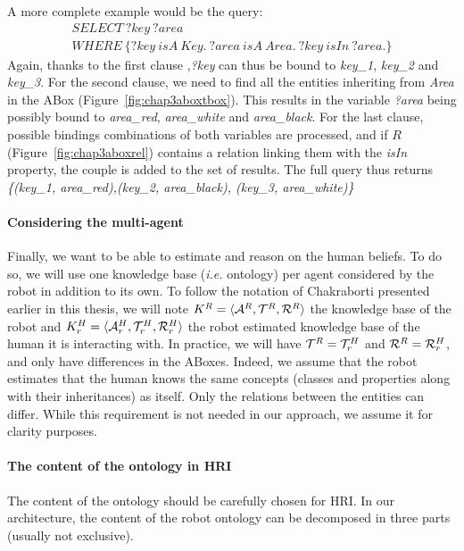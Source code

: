 \documentclass[a4paper,11pt,twoside]{StyleThese}
\begin{document}
A more complete example would be the query:
\begin{multline*}
SELECT \ ?key \ ?area\\
WHERE \ \{?key \ isA \ Key. \ ?area \ isA \ Area. \ ?key\ isIn \ ?area.\}
\end{multline*}
Again, thanks to the first clause ,\textit{?key} can thus be bound to \textit{key\_1}, \textit{key\_2} and \textit{key\_3}. For the second clause, we need to find all the entities inheriting from \textit{Area} in the ABox (Figure~\ref{fig:chap3aboxtbox}). This results in the variable \textit{?area} being possibly bound to \textit{area\_red}, \textit{area\_white} and \textit{area\_black}. For the last clause, possible bindings combinations of both variables are processed, and if $R$ (Figure~\ref{fig:chap3aboxrel}) contains a relation linking them with the \textit{isIn} property, the couple is added to the set of results. The full query thus returns \textit{\{(key\_1, area\_red),(key\_2, area\_black), (key\_3, area\_white)\}}


\paragraph{Considering the multi-agent}
Finally, we want to be able to estimate and reason on the human beliefs. To do so, we will use one knowledge base (\textit{i.e.} ontology) per agent considered by the robot in addition to its own. To follow the notation of Chakraborti \cite{chakraborti2018human} presented earlier in this thesis, we will note $K^R = \langle \mathcal{A}^R, \mathcal{T}^R, \mathcal{R}^R \rangle$ the knowledge base of the robot and $K^H_r = \langle \mathcal{A}^H_r, \mathcal{T}^H_r, \mathcal{R}^H_r \rangle$ the robot estimated knowledge base of the human it is interacting with. In practice, we will have $\mathcal{T}^R = \mathcal{T}^H_r$ and $\mathcal{R}^R = \mathcal{R}^H_r$, and only have differences in the ABoxes. Indeed, we assume that the robot estimates that the human knows the same concepts (classes and properties along with their inheritances) as itself. Only the relations between the entities can differ. While this requirement is not needed in our approach, we assume it for clarity purposes.

\paragraph{The content of the ontology in HRI}
The content of the ontology should be carefully chosen for HRI. In our architecture, the content of the robot ontology can be decomposed in three parts (usually not exclusive). 
\end{document}
